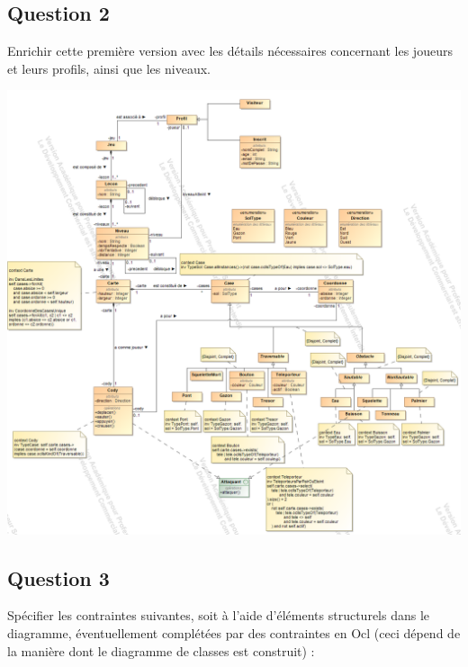 \documentclass[11pt]{article}
\begin{document}
\subsection{Question 2}
Enrichir cette première version avec les détails nécessaires concernant les joueurs et leurs profils, ainsi que les niveaux. 

\includegraphics[width=15 cm,height=18 cm]{Plateau_TEX.png}

\subsection{Question 3}
Spécifier les contraintes suivantes, soit à l'aide d'éléments structurels dans le diagramme, éventuellement complétées par des contraintes en Ocl (ceci dépend de la manière dont le diagramme de classes est construit) :
\end{document}
